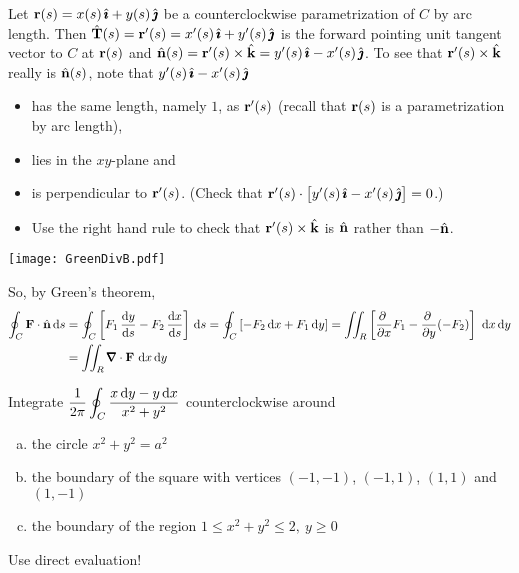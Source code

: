 \begin{solution} 
Let $\mathbf{r}(s)=x(s)\,\hat{\pmb{\imath}}+y(s)\,\hat{\pmb{\jmath}}$ be a counterclockwise parametrization of 
$C$ by arc length. Then $\hat{\mathbf{T}}(s) = \mathbf{r}'(s) = x'(s)\,\hat{\pmb{\imath}}+y'(s)\,\hat{\pmb{\jmath}}$
is the forward pointing unit tangent vector to $C$ at $\mathbf{r}(s)$
and $\hat{\mathbf{n}}(s) = \mathbf{r}'(s)\times\hat{\mathbf{k}}=y'(s)\,\hat{\pmb{\imath}}-x'(s)\,\hat{\pmb{\jmath}}$. To see
that $\mathbf{r}'(s)\times\hat{\mathbf{k}}$ really is $\hat{\mathbf{n}}(s)$, note that 
$y'(s)\,\hat{\pmb{\imath}}-x'(s)\,\hat{\pmb{\jmath}}$ 
\begin{itemize}\itemsep1pt \parskip0pt 
\item
has the same length, namely $1$, as $\mathbf{r}'(s)$ (recall that $\mathbf{r}(s)$ is a
parametrization by arc length),
\item
lies in the $xy$-plane and 

\item
is perpendicular to $\mathbf{r}'(s)$. 
(Check that $\mathbf{r}'(s)\cdot\big[y'(s)\,\hat{\pmb{\imath}}-x'(s)\,\hat{\pmb{\jmath}}\big]=0$.) 
\item
Use the right hand rule to check that $\mathbf{r}'(s)\times\hat{\mathbf{k}}$ is 
$\hat{\mathbf{n}}$ rather than $-\hat{\mathbf{n}}$.
\end{itemize}
\begin{center}
       \texttt{[image: GreenDivB.pdf]}
\end{center}
So, by Green's theorem,
\begin{align*}
\oint_C\vF\cdot\hn\,\dee{s}
&=\oint_C\left[F_1\,\diff{y}{s}-F_2\,\diff{x}{s}\right]\,\dee{s}
=\oint_C\left[-F_2\,\dee{x}+F_1\,\dee{y}\right]
=\dblInt_R\left[\pdiff{}{x}F_1-\pdiff{}{y}(-F_2)\right]\ \dee{x}\,\dee{y} \\
&=\dblInt_R\vnabla\cdot\vF\ \dee{x}\,\dee{y}
\end{align*}
\end{solution}


\begin{question}\label{prb Green singular}
Integrate $\displaystyle\frac{1}{2\pi}\oint_C \frac{x\,\mathrm{d}y-y\,\mathrm{d}x}{x^2+y^2}$
counterclockwise around 
\begin{enumerate}[(a)]
\item the circle $x^2+y^2=a^2$
\item the boundary of the square with vertices
         $(-1,-1)$, $(-1,1)$, $(1,1)$ and $(1,-1)$ 
\item the boundary of the region $1\le x^2+y^2\le 2,\ y\ge0$ 
\end{enumerate}
\end{question}

\begin{hint} 
Use direct evaluation!
\end{hint}

